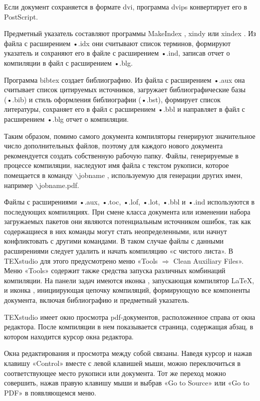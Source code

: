 \documentclass[a4paper, 14pt]{extarticle}
\newcommand{\n}{\par}
\begin{document}
	Если документ сохраняется в формате dvi, программа dvips конвертирует его в PostScript.\n
	
	Предметный указатель составляют программы MakeIndex , xindy или xindex . Из файла с расширением •.idx они считывают список терминов, формируют указатель и сохраняют его в файле с расширением •.ind, записав отчет о компиляции в файл с расширением •.blg.\n
	
	Программа bibtex создает библиографию. Из файла с расширением •.aux она считывает список цитируемых источников, загружает библиографические базы (•.bib) и стиль оформления библиографии (•.bst), формирует список литературы, сохраняет его в файл с расширением •.bbl и направляет в файл с расширением •.blg отчет о компиляции.\n

	Таким образом, помимо самого документа компиляторы генерируют значительное число дополнительных файлов, поэтому для каждого нового документа рекомендуется создать собственную рабочую папку. Файлы, генерируемые в процессе компиляции, наследуют имя файла с текстом рукописи, которое помещается в команду $\backslash$jobname , используемую для генерации других имен, например $\backslash$jobname.pdf.\n
	
	Файлы с расширениями •.aux, •.toc, •.lof, •.lot, •.bbl и •.ind используются в последующих компиляциях. При смене класса документа или изменении набора загружаемых пакетов они являются потенциальным источником ошибок, так как содержащиеся в них команды
	могут стать неопределенными, или начнут конфликтовать с другими командами. В таком случае файлы с данными расширениями следует удалить и начать компиляцию «с чистого листа». В TEXstudio для этого предусмотрено меню «Tools $\Longrightarrow$ Clean Auxiliary Files». Меню «Tools» содержит также средства запуска различных комбинаций компиляции. На панели задач имеются иконка , запускающая компилятор \LaTeX{}, и иконка , инициирующая цепочку компиляций, формирующую все компоненты документа, включая библиографию и предметный указатель.\n
	
	TEXstudio имеет окно просмотра pdf-документов, расположенное справа от окна редактора. После компиляции в нем показывается страница, содержащая абзац, в котором находится курсор окна редактора.\n 
	
	Окна редактирования и просмотра между собой связаны. Наведя курсор и нажав клавишу «Control» вместе с левой клавишей мыши, можно переключиться в соответствующее место рукописи или документа. Тот же переход можно совершить, нажав правую клавишу мыши и выбрав «Go to Source» или «Go to PDF» в появляющемся меню.\n
	
\end{document}
